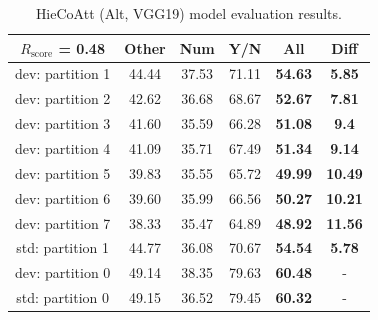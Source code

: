 \documentclass[letterpaper]{article}
\newcommand{\rscore}{}\def\rscore/{$R_{\text{score}}$}
\begin{document}
\begin{table}
\begin{subtable}{0.49\linewidth}
		\begin{tabular}{c | c c c c | c}
			\rscore/ = \textbf{0.48} & Other & Num   & Y/N   & All            & Diff           \\ [0.5ex]
			\hline
			dev: partition 1         & 44.44 & 37.53 & 71.11 & \textbf{54.63} & \textbf{5.85}  \\
			dev: partition 2         & 42.62 & 36.68 & 68.67 & \textbf{52.67} & \textbf{7.81}  \\
			dev: partition 3         & 41.60 & 35.59 & 66.28 & \textbf{51.08} & \textbf{9.4}   \\
			dev: partition 4         & 41.09 & 35.71 & 67.49 & \textbf{51.34} & \textbf{9.14}  \\
			dev: partition 5         & 39.83 & 35.55 & 65.72 & \textbf{49.99} & \textbf{10.49} \\
			dev: partition 6         & 39.60 & 35.99 & 66.56 & \textbf{50.27} & \textbf{10.21} \\
			dev: partition 7         & 38.33 & 35.47 & 64.89 & \textbf{48.92} & \textbf{11.56} \\
			\hline
			std: partition 1         & 44.77 & 36.08 & 70.67 & \textbf{54.54} & \textbf{5.78}  \\
			\hline
			dev: partition 0         & 49.14 & 38.35 & 79.63 & \textbf{60.48} & -              \\
			std: partition 0         & 49.15 & 36.52 & 79.45 & \textbf{60.32} & -              \\
			\hline
		\end{tabular}
		\caption{HieCoAtt (Alt, VGG19) model evaluation results.}


\end{subtable}
\end{table}
\end{document}
